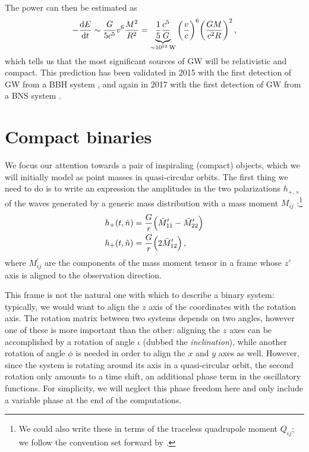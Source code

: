 \documentclass[main.tex]{subfiles}
\begin{document}
The power can then be estimated as 
%
\begin{align} \label{eq:energy-emission-estimate}
- \dv{E}{t} \sim \frac{G}{5 c^{5}} v^{6} \frac{M^2}{R^2} 
= \underbrace{\frac{1}{5} \frac{c^{5}}{G}}_{\sim\SI{e52}{W}} \qty( \frac{v}{c})^{6} \qty( \frac{GM}{c^2 R})^2
\,,
\end{align}
%
which tells us that the most significant sources of \ac{GW} will be relativistic and compact.
This prediction has been validated in 2015 with the first detection of \ac{GW} from a \ac{BBH} system \cite{abbottObservationGravitationalWaves2016}, and again in 2017 with the first detection of \ac{GW} from a \ac{BNS} system \cite{abbottGW170817ObservationGravitational2017}. 

\section{Compact binaries} \label{sec:compact-binaries-linear}

We focus our attention towards a pair of inspiraling (compact) objects, which we will initially model as point masses in quasi-circular orbits.
The first thing we need to do is to write an expression the amplitudes in the two polarizations \(h_{+, \times }\) of the waves generated by a generic mass distribution with a mass moment \(M_{ij}\) \cite[eqs.\ 3.67--68]{maggioreGravitationalWavesVolume2007}:\footnote{We could also write these in terms of the traceless quadrupole moment \(Q_{ij}\); we follow the convention set forward by \textcite{maggioreGravitationalWavesVolume2007}.} 
%
\begin{align}
h_{+}(t, \hat{n}) &= \frac{G}{r} \qty(\ddot{M}_{11}' - \ddot{M}_{22}')\\
h_{+}(t, \hat{n}) &= \frac{G}{r} \qty(2\ddot{M}_{12}')
\,,
\end{align}
%
where \(M^{\prime }_{ij}\) are the components of the mass moment tensor in a frame whose \(z'\) axis is aligned to the observation direction.

This frame is not the natural one with which to describe a binary system: typically, we would want to align the \(z\) axis of the coordinates with the rotation axis. 
The rotation matrix between two systems depends on two angles, however one of these is more important than the other: aligning the \(z\) axes can be accomplished by a rotation of angle \(\iota \) (dubbed the \emph{inclination}), while another rotation of angle \(\phi \) is needed in order to align the \(x\) and \(y\) axes as well. 
However, since the system is rotating around its axis in a quasi-circular orbit, the second rotation only amounts to a time shift, an additional phase term in the oscillatory functions. 
For simplicity, we will neglect this phase freedom here and only include a variable phase at the end of the computations.
\end{document}
